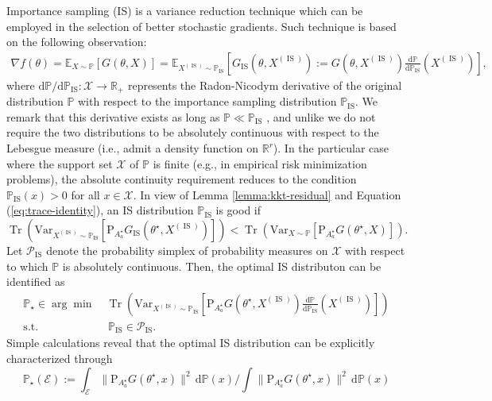 \documentclass[11pt,a4paper]{article}
\theoremstyle{definition}
\DeclareMathOperator*{\IS}{IS}
\DeclareMathOperator*{\st}{s.t.}
\DeclareMathOperator*{\trace}{Tr}
\newcommand{\norm}[1]{\| #1 \|}
\renewcommand{\tfrac}[2]{#1/#2}
\renewcommand{\Re}{\mathbb R}
\newcommand{\mc}{\mathcal}
\newcommand{\mb}{\mathbb}
\renewcommand{\d}{{\mathrm d}}
\newcommand{\defn}{:=}
\begin{document}
Importance sampling (IS) is a variance reduction technique \citep{glasserman2004monte} which can be employed in the selection of better stochastic gradients. Such technique is based on the following observation:
\begin{align}
\label{eq:IS}   
    \nabla  f(\theta) = \mathbb E_{X \sim \mathbb P}\left[ G(\theta,X)  \right] = \mathbb E_{X^{(\IS)} \sim \mathbb P_{\IS}}\left[ G_{\IS}(\theta, X^{(\IS)}) := G(\theta,X^{(\IS)}) \frac{\d \mb P}{\d \mb P_{\IS}}(X^{(\IS)}) \right],
\end{align}
where ${\mathrm{d} \mathbb P}/{\mathrm{d} \mathbb P_{\IS}}:\mc X\to\Re_+$ represents the Radon-Nicodym derivative of the original distribution $\mathbb P$ with respect to the importance sampling distribution $\mathbb P_{\IS}$. We remark that this derivative exists as long as $\mathbb P\ll \mathbb P_{\IS}$ \cite{nikodym1930sur}, and unlike \citet{Bardou2009computing} we do not require the two distributions to be absolutely continuous with respect to the Lebesgue measure (i.e., admit a density function  on $\Re^r$).
In the particular case where the support set $\mc X$ of $\mathbb P$ is finite (e.g., in empirical risk minimization problems), the absolute continuity requirement reduces to the condition $\mathbb P_{\IS}(x)>0$ for all $x\in \mc X$. 
In view of Lemma \ref{lemma:kkt-residual} and Equation (\ref{eq:trace-identity}), an IS distribution $\mathbb P_{\IS}$ is good if 
\[
  \trace \left(\text{Var}_{X^{(\IS)} \sim \mathbb P_{\IS}}[\text{P}_{A^\star_{a}} G_{\IS}(\theta^\star,X^{(\IS)})] \right) < \trace \left(\text{Var}_{X \sim \mathbb P}\left[\text{P}_{A^\star_{a}} G(\theta^\star,X)\right]\right).
\]
Let $\mc P_{\IS}$ denote the probability simplex of probability measures on $\mc X$ with respect to which $\mathbb P$ is absolutely continuous. Then, the optimal IS distributon can be identified as
\begin{equation*}
  \begin{split}
    \mathbb P_\star \in \arg\min & ~\trace\left(\text{Var}_{X^{(\IS)} \sim \mathbb P_{\IS}}\left[\text{P}_{A^\star_{a}} G(\theta^\star,X^{(\IS)}) \frac{\d \mb P}{\d \mb P_{\IS}}(X^{(\IS)})\right]\right) \\
    \st & ~\,\mb P_{\IS} \in \mc P_{\IS}.
  \end{split}
\end{equation*}
Simple calculations reveal that the optimal IS distribution can be explicitly characterized through
\begin{equation}
\label{eq:opt:IS}
    \mathbb P_\star(\mc E) \defn \textstyle\tfrac{\int_{\mc E}\norm{\text{P}_{A^\star_{a}} G(\theta^\star, x)}^2 \, \mathrm{d} \mathbb P(x)}{\int \norm{\text{P}_{A^\star_{a}} G(\theta^\star, x)}^2 \, \mathrm{d} \mathbb P(x) } 
\end{equation}
\end{document}
